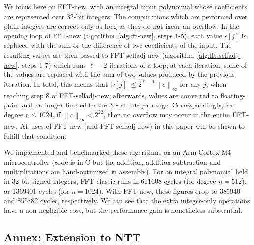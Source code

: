 \documentclass{llncs}
\newcommand{\norm}[1]{\left\|#1\right\|}
\newcommand{\norminf}[1]{\norm{#1}_{\infty}}
\begin{document}
We focus here on \textsf{FFT-new}, with an integral input polynomial
whose coefficients are represented over 32-bit integers. The
computations which are performed over plain integers are correct only as
long as they do not incur an overflow. In the opening loop of
\textsf{FFT-new} (algorithm~\ref{alg:fft-new}, steps 1-5), each value
$c[j]$ is replaced with the sum or the difference of two coefficients of
the input. The resulting values are then passed to
\textsf{FFT-selfadj-new} (algorithm~\ref{alg:fft-selfadj-new}, steps
1-7) which runs $\ell - 2$ iterations of a loop; at each iteration, some
of the values are replaced with the sum of two values produced by the
previous iteration. In total, this means that $|c[j]| \leq 2^{\ell-1}
\norminf{c}$ for any $j$, when reaching step 8 of
\textsf{FFT-selfadj-new}; afterwards, values are converted to
floating-point and no longer limited to the 32-bit integer range.
Correspondingly, for degree $n \leq 1024$, if $\norminf{c} < 2^{22}$,
then no overflow may occur in the entire \textsf{FFT-new}. All uses of
\textsf{FFT-new} (and \textsf{FFT-selfadj-new}) in this paper will be
shown to fulfill that condition.

We implemented and benchmarked these algorithms on an Arm Cortex M4
microcontroller (code is in C but the addition, addition-subtraction and
multiplications are hand-optimized in assembly). For an integral
polynomial held in 32-bit signed integers, \textsf{FFT-classic} runs in
611608 cycles (for degree $n = 512$), or 1369401 cycles (for $n =
1024$). With \textsf{FFT-new}, these figures drop to 385940 and 855782
cycles, respectively. We can see that the extra integer-only operations
have a non-negligible cost, but the performance gain is nonetheless
substantial.

\subsection{Annex: Extension to NTT}
\end{document}
